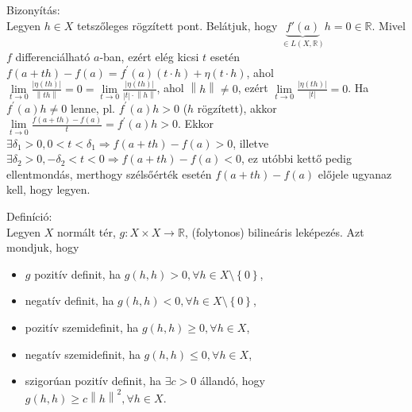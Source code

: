 \documentclass[12pt,a4paper]{scrartcl}
\providecommand{\tightlist}{%
  \setlength{\itemsep}{0pt}\setlength{\parskip}{0pt}}
\newenvironment{definicio}{}{}
\newenvironment{bizonyitas}{}{}
\begin{document}
\begin{bizonyitas}

Bizonyítás:\\
Legyen \(h \in X\) tetszőleges rögzített pont. Belátjuk, hogy
\(\underbrace {f'\left( a \right)}_{ \in L\left( {X,\mathbb{R}} \right)}h = 0 \in \mathbb{R}\).
Mivel \(f\) differenciálható \(a\)-ban, ezért elég kicsi \(t\) esetén
\(f\left( {a + th} \right) - f\left( a \right) = f^{\prime}\left( a \right)\left( {t \cdot h} \right) + \eta\left( {t \cdot h} \right)\),
ahol
\(\lim\limits_{t\rightarrow 0}\frac{\left| {\eta\left( {th} \right)} \right|}{\left\| {th} \right\|} = 0 = \lim\limits_{t\rightarrow 0}\frac{\left| {\eta\left( {th} \right)} \right|}{\left| t \right| \cdot \left\| h \right\|}\),
ahol \(\left\| h \right\| \neq 0\), ezért
\(\lim\limits_{t\rightarrow 0}\frac{\left| {\eta\left( {th} \right)} \right|}{\left| t \right|} = 0\).
Ha \(f^{\prime}\left( a \right)h \neq 0\) lenne, pl.
\(f^{\prime}\left( a \right)h > 0\) (\(h\) rögzített), akkor
\(\lim\limits_{t\rightarrow 0}\frac{f\left( {a + th} \right) - f\left( a \right)}{t} = f^{\prime}\left( a \right)h > 0\).
Ekkor
\(\left. \exists\delta_{1} > 0,0 < t < \delta_{1}\Rightarrow f\left( {a + th} \right) - f\left( a \right) > 0 \right.\),
illetve
\(\left. \exists\delta_{2} > 0, - \delta_{2} < t < 0\Rightarrow f\left( {a + th} \right) - f\left( a \right) < 0 \right.\),
ez utóbbi kettő pedig ellentmondás, merthogy szélsőérték esetén
\(f\left( {a + th} \right) - f\left( a \right)\) előjele ugyanaz kell,
hogy legyen.

\end{bizonyitas}

\begin{definicio}

Definíció:\\
Legyen \(X\) normált tér,
\(\left. g:X \times X\rightarrow{\mathbb{R}} \right.\), (folytonos)
bilineáris leképezés. Azt mondjuk, hogy

\begin{itemize}
\tightlist
\item
  \(g\) pozitív definit, ha
  \(g\left( {h,h} \right) > 0,\forall h \in X\text{\textbackslash}\left\{ 0 \right\}\),
\item
  negatív definit, ha
  \(g\left( {h,h} \right) < 0,\forall h \in X\text{\textbackslash}\left\{ 0 \right\}\),
\item
  pozitív szemidefinit, ha
  \(g\left( {h,h} \right) \geq 0,\forall h \in X\),
\item
  negatív szemidefinit, ha
  \(g\left( {h,h} \right) \leq 0,\forall h \in X\),
\item
  szigorúan pozitív definit, ha \(\exists c > 0\) állandó, hogy
  \(g\left( {h,h} \right) \geq c\left\| h \right\|^{2},\forall h \in X\).
\end{itemize}

\end{definicio}
\end{document}

